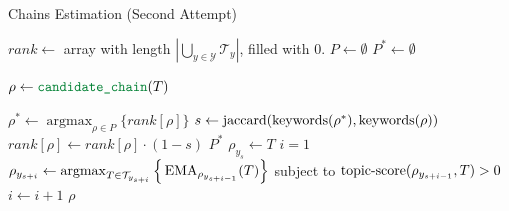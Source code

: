 \begin{algorithm}[H]
	\caption{Chains Estimation (Second Attempt)}\label{alg:chain_extraction2}
	\begin{algorithmic}[1]
		\State{} $rank \leftarrow$ array with length $|\bigcup_{y\in \mathcal Y} \mathcal{T}_y|$, filled with 0.
		\State{} $P \leftarrow \emptyset$
		\State{} $P^* \leftarrow \emptyset$

		\State{} $\rho \leftarrow \texttt{\color{AlgProcedureColor}candidate\textunderscore{}chain}(T)$
		\EndFor

		\State $\rho^* \leftarrow \mathop{\mathrm{argmax}}_{\rho\in P} \Big\{rank[\rho]\Big\}$
			\State $s \leftarrow \mathrm{jaccard}(\mathop{\mathrm{keywords}}(\rho^*),\mathop{\mathrm{keywords}}(\rho))$
			\State $rank[\rho]\leftarrow rank[\rho]\cdot(1-s)$
		\EndFor
 		\EndFor
 		\State \Return $P^*$
		\EndProcedure
		\Statex
		\State $\rho_{y_s} \leftarrow T$
		\State $i=1$
			\State $\rho_{y_{s+i}} \leftarrow \mathop{\mathrm{argmax}}_{T\in \mathcal{T}_{y_{s+i}}} \Big\{\operatorname{EMA}_{\rho_{y_{s+i-1}}}(T)\Big\}$ subject to $\mathop{\mathrm{topic\text{-}score}}(\rho_{y_{s+i-1}}, T) > 0$
			\State $i \leftarrow i+1$
		\EndWhile
		\State\Return $\rho$
		\EndProcedure
	\end{algorithmic}
\end{algorithm}


